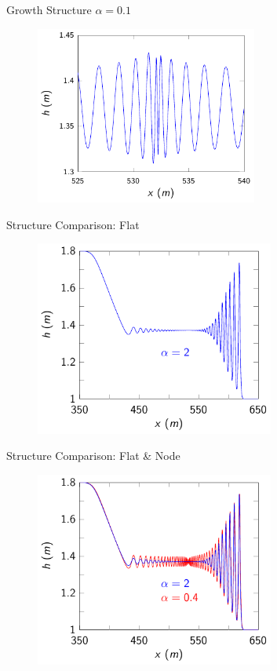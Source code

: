 \documentclass[pdf]{beamer}
\begin{document}
\begin{frame}{Growth Structure $\alpha = 0.1$}
	\begin{figure}
		\includegraphics[width=0.65\textwidth]{./Pictures/Results/Example/growthz.pdf}
	\end{figure}
\end{frame}

\begin{frame}{Structure Comparison: Flat}
		\begin{figure}
			\includegraphics[width=0.7\textwidth]{./Pictures/Results/Example/6.pdf}
		\end{figure}
\end{frame}

\begin{frame}{Structure Comparison: Flat \& Node}
	\begin{figure}
		\includegraphics[width=0.7\textwidth]{./Pictures/Results/Example/69.pdf}
	\end{figure}
\end{frame}
\end{document}
